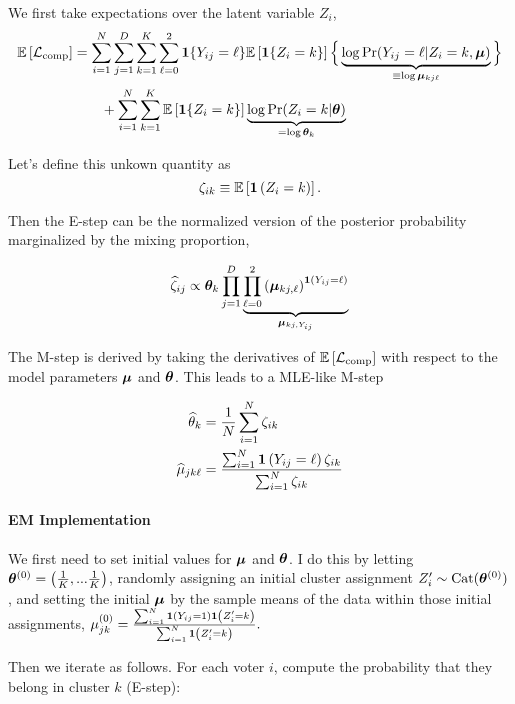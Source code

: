 \documentclass[11pt]{article}
\begin{document}
We first take expectations over the latent variable $Z_{i}$,
\begin{align}
\mathbb{E}\left[\mathcal{L}_{\text{comp}}\right]
& = \sum^{N}_{i=1}\sum^{D}_{j=1}\sum^{K}_{k=1}\sum^{2}_{\ell = 0}
\bm{1}\{Y_{ij} = \ell\} \mathbb{E}\left[\bm{1}\{Z_{i} = k\}\right]\Big\{
\underbrace{\log \Pr(Y_{ij} = \ell | Z_{i} = k, \bm{\mu})}_{\equiv \log\bm{\mu}_{kj\ell}}
\Big\} \nonumber\\
& \qquad +
\sum^{N}_{i=1}\sum^{K}_{k=1}\mathbb{E}\left[\bm{1}\{Z_{i} = k\}\right]\underbrace{\log \Pr(Z_{i} = k | \bm{\theta})}_{= \log \bm{\theta}_{k}}
\end{align}

 Let's define this unkown quantity as 
\[\zeta_{ik} \equiv \mathbb{E}\left[\bm{1}\left(Z_i = k\right)\right].\]

Then the E-step can be the normalized version of the posterior probability marginalized by the mixing proportion,

\begin{align}
\widehat{\zeta}_{ij} \propto \bm{\theta}_k\prod^D_{j = 1}\underbrace{\prod^{2}_{\ell = 0}\left(\bm{\mu}_{kj,\ell}\right)^{\bm{1}\left(Y_{ij} = \ell\right)}}_{\bm{\mu}_{kj, Y_{ij}}}
\end{align}

The M-step is derived by taking the derivatives of \(\mathbb{E}\left[\mathcal{L}_{\text{comp}}\right]\) with respect to the model parameters \(\bm{\mu}\) and \(\bm{\theta}\). This leads to a MLE-like M-step

\begin{align}
\widehat{\theta}_{k} &= \frac{1}{N}\sum^N_{i = 1}\zeta_{ik}\\
\widehat{\mu}_{jk\ell} &= \frac{\sum^N_{i=1}\bm{1}\left(Y_{ij} = \ell\right)\zeta_{ik}}{\sum^{N}_{i=1}\zeta_{ik}}
\end{align}


\paragraph{EM Implementation} We first need to set initial values for \(\bm{\mu}\) and \(\bm{\theta}\). I do this by letting \(\bm{\theta}^{(0)} = \left(\frac{1}{K},...\frac{1}{K}\right)\), randomly assigning an initial cluster assignment \(Z_i^\prime \sim \text{Cat}(\bm{\theta}^{(0)})\), and setting the initial \(\bm{\mu}\) by the sample means of the data within those initial assignments, \(\mu_{jk}^{(0)} = \frac{\sum_{i=1}^{N}\bm{1}\left(Y_{ij} = 1\right)\bm{1}\left(Z_{i}^{\prime} = k\right)}{\sum_{i=1}^{N}\bm{1}\left(Z_{i}^{\prime} = k\right)}.\) 

Then we iterate as follows. For each voter \(i\), compute the probability that they belong in cluster \(k\) (E-step):
\end{document}
